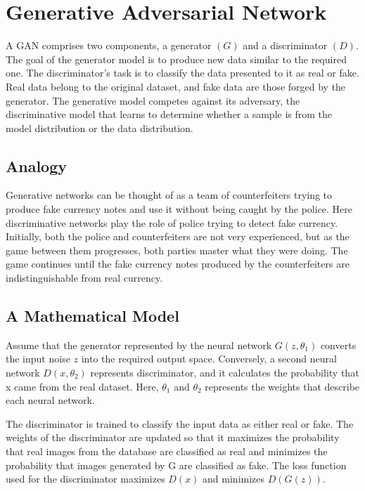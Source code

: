 \chapter{Generative Adversarial Network}
\begin{onehalfspace}
    A GAN comprises two components, a generator $(G)$ and a discriminator $(D)$. 
    The goal of the generator model is to produce new data similar to the required 
    one. The discriminator's task is to classify the data presented to it as real or 
    fake. Real data belong to the original dataset, and fake data are those 
    forged by the generator. The generative model competes against its adversary, 
    the discriminative model that learns to determine whether a sample is from the 
    model distribution or the data distribution.    
\section{Analogy}
    Generative networks can be thought of as a team of counterfeiters trying 
    to produce fake currency notes and use it without being caught by the 
    police. Here discriminative networks play the role of police trying to 
    detect fake currency. Initially, both the police and counterfeiters are not 
    very experienced, but as the game between them progresses, both parties 
    master what they were doing.  The game continues until the fake currency 
    notes produced by the counterfeiters are indistinguishable from real 
    currency.

\section{A Mathematical Model}

    Assume that the generator represented by the neural network 
    \(G(z, \theta_{1})\) converts the input noise \(z\) into the required output 
    space. Conversely, a second neural network \(D(x, \theta_{2})\) represents 
    discriminator, and it calculates the probability that x came from the real 
    dataset. Here, $\theta_{1}$ and $\theta_{2}$ represents the weights that 
    describe each neural network.

    The discriminator is trained to classify the input data as either real or 
    fake. The weights of the discriminator are updated so that it maximizes the 
    probability that real images from the database are classified as real and 
    minimizes the probability that images generated by G are classified as fake. 
    The loss function used for the discriminator maximizes \(D(x)\) and minimizes 
    \(D(G(z))\). 


\end{onehalfspace}
